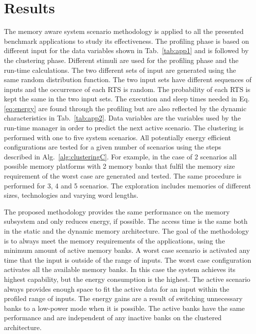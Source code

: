 \section{Results}
\label{sec:resultsC}

The memory aware system scenario methodology is applied to all the presented benchmark applications to study its effectiveness. 
The profiling phase is based on different input for the data variables shown in Tab.~\ref{tab:app1} and is followed by the clustering phase. 
Different stimuli are used for the profiling phase and the run-time calculations. 
The two different sets of input are generated using the same random distribution function. 
The two input sets have different sequences of inputs and the occurrence of each RTS is random. 
The probability of each RTS is kept the same in the two input sets.
The execution and sleep times needed in Eq.\ref{eq:energy} are found through the profiling but are also reflected by the dynamic characteristics in Tab.~\ref{tab:app2}. 
Data variables are the variables used by the run-time manager in order to predict the next active scenario. 
The clustering is performed with one to five system scenarios. 
All potentially energy efficient configurations are tested for a given number of scenarios using the steps described in Alg.~\ref{alg:clusteringC}. 
For example, in the case of 2 scenarios all possible memory platforms with 2 memory banks that fulfil the memory size requirement of the worst case are generated and tested. 
The same procedure is performed for 3, 4 and 5 scenarios. 
The exploration includes memories of different sizes, technologies and varying word lengths. 

The proposed methodology provides the same performance on the memory subsystem and only reduces energy, if possible. 
The access time is the same both in the static and the dynamic memory architecture. 
The goal of the methodology is to always meet the memory requirements of the applications, using the minimum amount of active memory banks.
A worst case scenario is activated any time that the input is outside of the range of inputs. 
The worst case configuration activates all the available memory banks. 
In this case the system achieves its highest capability, but the energy consumption is the highest.
The active scenario always provides enough space to fit the active data for an input within the profiled range of inputs. 
The energy gains are a result of switching unnecessary banks to a low-power mode when it is possible. 
The active banks have the same performance and are independent of any inactive banks on the clustered architecture.

